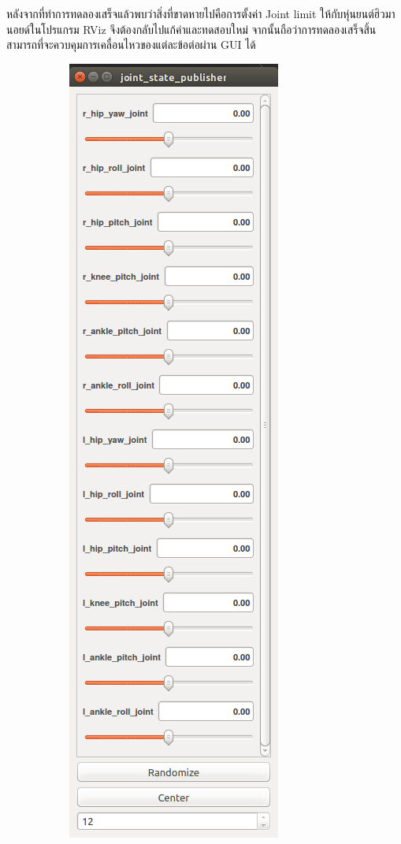หลังจากที่ทำการทดลองเสร็จแล้วพบว่าสิ่งที่ขาดหายไปคือการตั้งค่า Joint limit ให้กับหุ่นยนต์ฮิวมานอยด์ในโปรแกรม RViz
จึงต้องกลับไปแก้ค่าและทดสอบใหม่ จากนั้นถือว่าการทดลองเสร็จสิ้น สามารถที่จะควบคุมการเคลื่อนไหวของแต่ละข้อต่อผ่าน GUI ได้

\begin{figure}[!ht]
    \centering
    \begin{subfigure}[b]{0.15\textwidth}
        \centering
        \includegraphics[width=\textwidth]{chapter4/images/uthai_rviz_gui.png}

\end{subfigure}
\end{figure}
